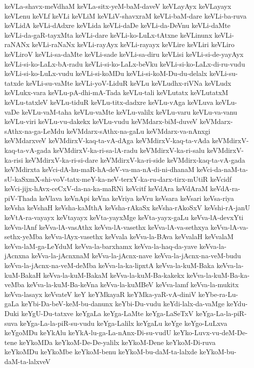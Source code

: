 {keVLa-shavx-meVdhaM
keVLa-sitx-yeM-baM-daveV
keVLayAyx
keVLayayx
keVLenu
keVLf
keVLi
keVLiM
keVLiV-shavxraM
keVLi-baM-dare
keVLi-ba-ruva
keVLidA
keVLi-dAdxre
keVLida
keVLi-daDe
keVLi-da-DeVnu
keVLi-daMte
keVLi-da-gaR-tayxMta
keVLi-dare
keVLi-ko-LuLx-tAtxne
keVLinunx
keVLi-raNANx
keVLi-raNaNx
keVLi-rayAyx
keVLi-rayayx
keVLire
keVLiri
keVLiro
keVLiroV
keVLi-sa-daMte
keVLi-sade
keVLi-sa-diru
keVLisi
keVLi-si-de-yayAyx
keVLi-si-ko-LaLx-bA-radu
keVLi-si-ko-LaLx-beVku
keVLi-si-ko-LaLx-di-ru-vudu
keVLi-si-ko-LuLx-vudu
keVLi-si-koMDu
keVLi-si-koM-Du-du-delalx
keVLi-su-tatxde
keVLi-su-vaMte
keVLi-yoV-LiduR
keVLu
keVLudhx-riVNa
keVLudx
keVLukx-vara
keVLu-pA-dhi-mA-Tada
keVLu-tali
keVLutatx
keVLutatxM
keVLu-tatxleV
keVLu-tiduR
keVLu-titx-dadxre
keVLu-vAga
keVLuva
keVLu-vaDe
keVLu-vaM-taha
keVLu-vaMte
keVLu-valilx
keVLu-varu
keVLu-va-vanu
keVLu-viri
keVLu-vu-dakekx
keVLu-vudu
keVMdarx-biM-duveV
keVMdarx-sAthx-na-ga-LeMdu
keVMdarx-sAthx-na-gaLu
keVMdarx-va-nAnxgi
keVMdarxveV
keVMdirxV-kaq-ta-vA-dAga
keVMdirxV-kaq-ta-vAda
keVMdirxV-kaq-ta-vA-gada
keVMdirxV-ka-ri-sa-lA-radu
keVMdirxV-ka-ri-salu
keVMdirxV-ka-risi
keVMdirxV-ka-ri-si-dare
keVMdirxV-ka-ri-side
keVMdirx-kaq-ta-vA-gada
keVMdirxta
keVci-dA-hu-maR-hA-deV-va-ma-nA-di-ni-dhanaM
keVci-da-naM-ta-sU-kaSxmX-shi-voV-tatx-meY-ka-neV-terxY-ka-ru-darx-tirx-mUtiR
keVcidf
keVci-jijx-hAvx-ceCxV-da-na-ka-maRNi
keVcitf
keVdAra
keVdAraM
keVdA-ra-piV-Thada
keVlava
keVnApi
keVna
keVriya
keVru
keVsara
keVsari
keVsa-riya
keVsha
keVshaH
keVsha-kaMthA
keVsha-rAkaSx
keVsha-rAkoSxV
keVshi-rA-janU
keVtA-ra-vayayx
keVtayayx
keVta-yayxMge
keVta-yayx-gaLu
keVva-lA-devxYti
keVva-lAnf
keVva-lA-vasAthx
keVva-lA-vasethx
keVva-lA-va-sethxya
keVva-lA-va-sethx-yeMba
keVva-lAyx-vasethx
keVvala
keVva-la-BAva
keVvalaH
keVvalaM
keVva-laM-ga-LeYduM
keVva-la-barxhamx
keVva-la-haq-da-yave
keVva-la-jAcnxna
keVva-la-jAcnxnaM
keVva-la-jAcnx-nave
keVva-la-jAcnx-na-veM-budu
keVva-la-jAcnx-na-veM-deMba
keVva-la-ka-lipxtA
keVva-la-kuM-Baka
keVva-la-kuM-BakaH
keVva-la-kuM-BakaM
keVva-la-kuM-Ba-kakekx
keVva-la-kuM-Ba-ka-veMba
keVva-la-kuM-Ba-keVna
keVva-la-kuMBeV
keVva-lamf
keVva-la-mukitx
keVva-lasayx
keVvateV
keY
keYMkayaR
keYMka-yaR-vA-diniV
keYbe-ra-Lu-gaLa
keYbi-Da-beV-keM-bu-danunx
keYbi-Du-vudu
keYdi-lalx-da-vaMge
keYdu-Duki
keYgU-Du-tatxve
keYgaLa
keYga-LaMte
keYga-LaSeTxV
keYga-La-la-piR-suva
keYga-La-la-piR-su-vudu
keYga-Lalilx
keYgaLu
keYge
keYgo-LuLxva
keYgoMDu
keYkAlu
keYkA-lu-ga-La-nAnx-Di-su-vudU
keYko-Luvx-vu-deM-De-tene
keYkoMDa
keYkoM-De-De-yalilx
keYkoM-Dene
keYkoM-Di-ruva
keYkoMDu
keYkoMbe
keYkoM-benu
keYkoM-bu-daM-ta-lalxde
keYkoM-bu-daM-ta-lalxveV
}
